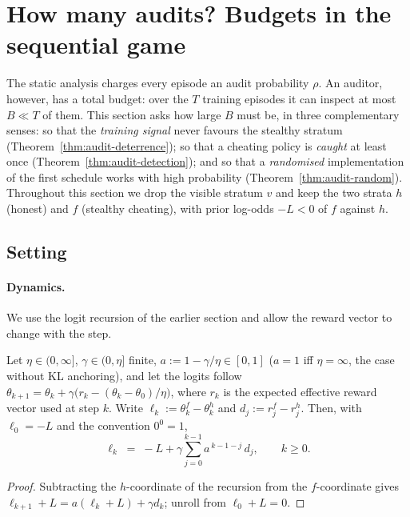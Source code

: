 \section{How many audits? Budgets in the sequential game}
\label{sec:audit-budget}

The static analysis charges every episode an audit probability $\rho$. An
auditor, however, has a total budget: over the $T$ training episodes it can
inspect at most $B\ll T$ of them. This section asks how large $B$ must be, in
three complementary senses: so that the \emph{training signal} never favours
the stealthy stratum (Theorem~\ref{thm:audit-deterrence}); so that a cheating
policy is \emph{caught} at least once
(Theorem~\ref{thm:audit-detection}); and so that a \emph{randomised}
implementation of the first schedule works with high probability
(Theorem~\ref{thm:audit-random}). Throughout this section we drop the visible
stratum $v$ and keep the two strata $h$ (honest) and $f$ (stealthy cheating),
with prior log-odds $-L<0$ of $f$ against $h$.

\subsection{Setting}

\paragraph{Dynamics.} We use the logit recursion of the earlier section and
allow the reward vector to change with the step.

\begin{lemma}\label{lem:audit-logodds}
Let $\eta\in(0,\infty]$, $\gamma\in(0,\eta]$ finite, $a:=1-\gamma/\eta\in[0,1]$
($a=1$ iff $\eta=\infty$, the case without KL anchoring), and let the logits
follow $\theta_{k+1}=\theta_k+\gamma\bigl(r_k-(\theta_k-\theta_0)/\eta\bigr)$,
where $r_k$ is the expected effective reward vector used at step $k$. Write
$\ell_k:=\theta_k^{f}-\theta_k^{h}$ and $d_j:=r_j^{f}-r_j^{h}$. Then, with
$\ell_0=-L$ and the convention $0^0=1$,
\begin{equation}\label{eq:audit-logodds}
  \ell_k \;=\; -L+\gamma\sum_{j=0}^{k-1}a^{\,k-1-j}\,d_j ,\qquad k\ge 0 .
\end{equation}
\end{lemma}
\begin{proof}
Subtracting the $h$-coordinate of the recursion from the $f$-coordinate gives
$\ell_{k+1}+L=a(\ell_k+L)+\gamma d_k$; unroll from $\ell_0+L=0$.
\end{proof}

